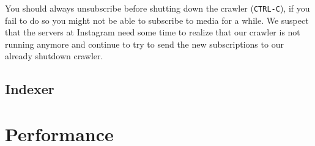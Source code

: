 \documentclass[11pt]{article}
\begin{document}
		You should always unsubscribe before shutting down the crawler (\texttt{CTRL-C}), if you fail to do so you might not be able to subscribe to media for a while. We suspect that the servers at Instagram need some time to realize that our crawler is not running anymore and continue to try to send the new subscriptions to our already shutdown crawler.
	\subsection{Indexer}
\section{Performance}
\end{document}
